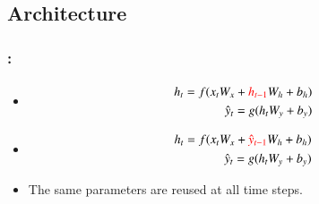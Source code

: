 \documentclass[xcolor=table]{beamer}
\begin{document}
\subsection{Architecture}

\begin{frame}
	\frametitle{\insertshortsubtitle: \insertsection}
	\framesubtitle{\insertsubsection}
	
	\begin{minipage}{0.49\textwidth} 
		\begin{itemize}
			\item {}
			\begin{align*}
				h_t = f(x_t W_x + \textcolor{red}{h_{t-1}} W_h + b_h) \\
				\hat{y}_t = g(h_t W_y + b_y)
			\end{align*}
			
			\item {}
			\begin{align*}
				h_t = f(x_t W_x + \textcolor{red}{\hat{y}_{t-1}} W_h + b_h) \\
				\hat{y}_t = g(h_t W_y + b_y)
			\end{align*}
			
			\item The same parameters are reused at all time steps.
		\end{itemize}
	\end{minipage}
	\begin{minipage}{0.5\textwidth}
	\end{minipage}
	
\end{frame}
\end{document}
